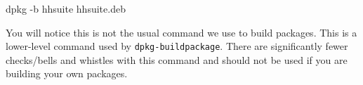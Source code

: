 \documentclass[]{article}
\newenvironment{Shaded}{}{}
\newcommand{\NormalTok}[1]{{#1}}
\begin{document}
\begin{Shaded}
\begin{Highlighting}[]
\NormalTok{dpkg -b hhsuite hhsuite.deb}
\end{Highlighting}
\end{Shaded}
You will notice this is not the usual command we use to build packages.
This is a lower-level command used by \texttt{dpkg-buildpackage}. There
are significantly fewer checks/bells and whistles with this command and
should not be used if you are building your own packages.
\end{document}
